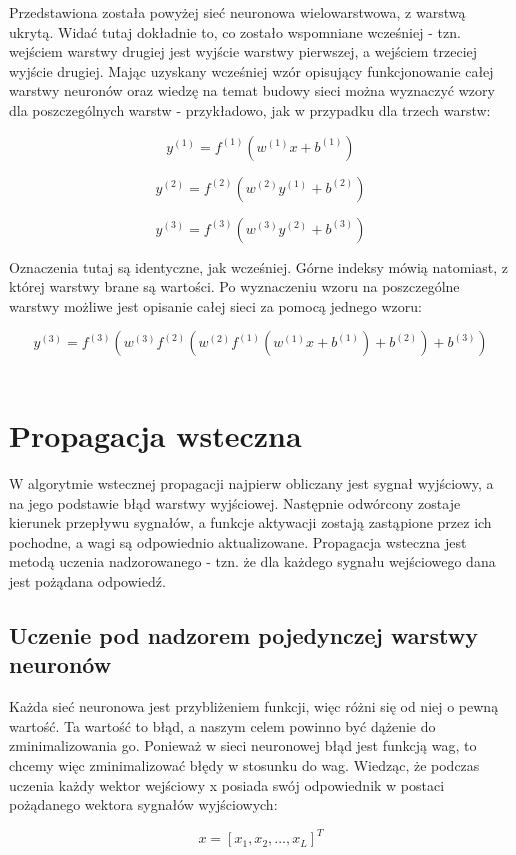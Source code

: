 \documentclass[a4paper, 12pt]{report}
\begin{document}
Przedstawiona została powyżej sieć neuronowa wielowarstwowa, z warstwą ukrytą. Widać tutaj dokładnie to, co zostało wspomniane wcześniej - tzn. wejściem warstwy drugiej jest wyjście warstwy pierwszej, a wejściem trzeciej wyjście drugiej.
\newpage
Mając uzyskany wcześniej wzór opisujący funkcjonowanie całej warstwy neuronów oraz wiedzę na temat budowy sieci można wyznaczyć wzory dla poszczególnych warstw - przykładowo, jak w przypadku dla trzech warstw:

$$y^{(1)} = f^{(1)}\left( w^{(1)}x + b^{(1)} \right)$$

$$y^{(2)} = f^{(2)}\left( w^{(2)}y^{(1)} + b^{(2)} \right)$$

$$y^{(3)} = f^{(3)} \left( w^{(3)}y^{(2)} + b^{(3)} \right)$$ 

Oznaczenia tutaj są identyczne, jak wcześniej. Górne indeksy mówią natomiast, z której warstwy brane są wartości.
Po wyznaczeniu wzoru na poszczególne warstwy możliwe jest opisanie całej sieci za pomocą jednego wzoru:

$$y^{(3)} = f^{(3)} \left(w^{(3)} f^{(2)}\left( w^{(2)} f^{(1)}\left( w^{(1)}x + b^{(1)} \right)+ b^{(2)} \right) + b^{(3)} \right)$$ \\

\section{Propagacja wsteczna}
W algorytmie wstecznej propagacji najpierw obliczany jest sygnał wyjściowy, a na jego podstawie błąd warstwy wyjściowej. Następnie odwórcony zostaje kierunek przepływu sygnałów, a funkcje aktywacji zostają zastąpione przez ich pochodne, a wagi są odpowiednio aktualizowane.
Propagacja wsteczna jest metodą uczenia nadzorowanego - tzn. że dla każdego sygnału wejściowego dana jest pożądana odpowiedź.

\subsection{Uczenie pod nadzorem pojedynczej warstwy neuronów}
Każda sieć neuronowa jest przybliżeniem funkcji, więc różni się od niej o pewną wartość. Ta wartość to błąd, a naszym celem powinno być dążenie do zminimalizowania go. Ponieważ w sieci neuronowej błąd jest funkcją wag, to chcemy więc zminimalizować błędy w stosunku do wag. 
Wiedząc, że podczas uczenia każdy wektor wejściowy x posiada swój odpowiednik w postaci pożądanego wektora sygnałów wyjściowych:

$$ x = [x_1, x_2, ..., x_L]^{T}$$
\end{document}
